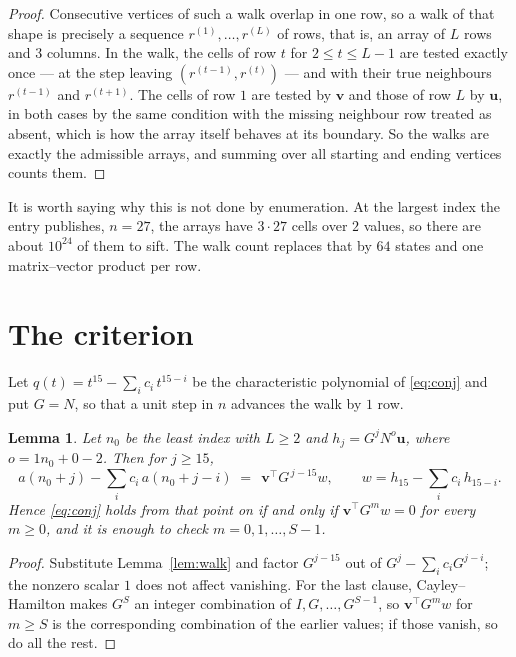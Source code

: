 \documentclass[11pt,a4paper]{article}
\theoremstyle{plain}
\newtheorem{lemma}[theorem]{Lemma}
\theoremstyle{definition}
\begin{document}
\begin{proof}
Consecutive vertices of such a walk overlap in one row, so a walk of that shape is
precisely a sequence $r^{(1)},\dots,r^{(L)}$ of rows, that is, an array of $L$ rows
and $3$ columns. In the walk, the cells of row $t$ for $2\le t\le L-1$ are tested
exactly once --- at the step leaving $(r^{(t-1)},r^{(t)})$ --- and with their true
neighbours $r^{(t-1)}$ and $r^{(t+1)}$. The cells of row $1$ are tested by
$\mathbf{v}$ and those of row $L$ by $\mathbf{u}$, in both cases by the same condition
with the missing neighbour row treated as absent, which is how the array itself behaves at
its boundary. So the walks are exactly the admissible arrays, and summing over all starting
and ending vertices counts them.
\end{proof}


It is worth saying why this is not done by enumeration. At the largest index the entry
publishes, $n=27$, the arrays have $3\cdot27$ cells over
$2$ values, so there are about $10^{24}$ of them to sift. The
walk count replaces that by $64$ states and one matrix--vector product per row.
\section{The criterion}

Let $q(t)=t^{15}-\sum_i c_i\,t^{15-i}$ be the characteristic polynomial of
\eqref{eq:conj} and put $G=N$, so that a unit step in $n$ advances the walk by
$1$ row.

\begin{lemma}\label{lem:crit}
Let $n_0$ be the least index with $L\ge2$ and $h_j=G^{j}N^{o}\mathbf{u}$, where
$o=1n_0+0-2$. Then for $j\ge15$,
\[
a(n_0+j)-\sum_i c_i\,a(n_0+j-i)\;=\;\,\mathbf{v}^{\!\top}G^{\,j-15}w,
\qquad w=h_{15}-\sum_i c_i\,h_{15-i} .
\]
Hence \eqref{eq:conj} holds from that point on if and only if
$\mathbf{v}^{\!\top}G^{m}w=0$ for every $m\ge0$, and it is enough to check
$m=0,1,\dots,S-1$.
\end{lemma}

\begin{proof}
Substitute Lemma~\ref{lem:walk} and factor $G^{j-15}$ out of
$G^{j}-\sum_ic_iG^{j-i}$; the nonzero scalar $1$ does not affect
vanishing. For the last clause, Cayley--Hamilton makes $G^{S}$ an integer combination of
$I,G,\dots,G^{S-1}$, so $\mathbf{v}^{\!\top}G^{m}w$ for $m\ge S$ is the corresponding
combination of the earlier values; if those vanish, so do all the rest.
\end{proof}
\end{document}
